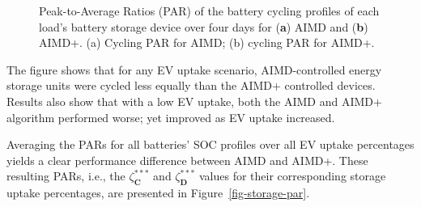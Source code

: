 \begin{figure}\centering
 \vspace{-6pt}
 \caption{Peak-to-Average Ratios (PAR) of the battery cycling profiles of each load's battery storage device over four days for (\textbf{a}) AIMD  and (\textbf{b}) AIMD+. ({a}) Cycling PAR for AIMD; ({b}) cycling PAR for AIMD+.}
 \label{fig-storage-par-large}
\end{figure}

The figure shows that for any EV uptake scenario, AIMD-controlled energy storage units were cycled less equally than the AIMD+ controlled devices. Results also show that with a low EV uptake, both the AIMD and AIMD+ algorithm performed worse; yet improved as EV uptake increased.

Averaging the PARs for all batteries' SOC profiles over all EV uptake percentages yields a clear performance difference between AIMD and AIMD+. These resulting PARs, i.e., the $\zeta_\textbf{C}^{***}$ and $\zeta_\textbf{D}^{***}$ values for their corresponding storage uptake percentages, are presented in Figure~\ref{fig-storage-par}.

